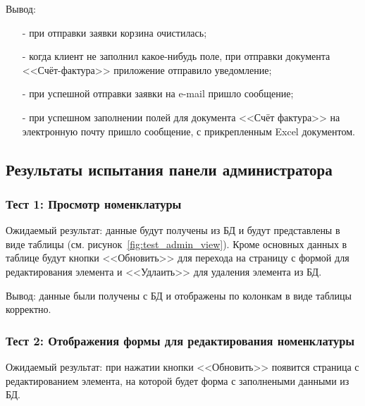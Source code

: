 Вывод:

\begin{itemize}
    \item[-] при отправки заявки корзина очистилась;
    \item[-] когда клиент не заполнил какое-нибудь поле, при отправки документа <<Счёт-фактура>>
    приложение отправило уведомление;
    \item[-] при успешной отправки заявки на e-mail пришло сообщение;
    \item[-] при успешном заполнении полей для документа <<Счёт фактура>> на электронную почту пришло сообщение,
    с прикрепленным Excel документом.
\end{itemize}

\subsection{Результаты испытания панели администратора}

\subsubsection*{Тест 1: Просмотр номенклатуры}

Ожидаемый результат: данные будут получены из БД и будут представлены в виде таблицы (см. рисунок~\ref{fig:test_admin_view}).
Кроме основных данных в таблице будут кнопки <<Обновить>> для перехода на страницу с формой для редактирования элемента и <<Удлаить>> для удаления элемента из БД.




Вывод: данные были получены с БД и отображены по колонкам в виде таблицы корректно.

\subsubsection*{Тест 2: Отображения формы для редактирования номенклатуры}

Ожидаемый результат: при нажатии кнопки <<Обновить>> появится страница с редактированием элемента,
на которой будет форма с заполнеными данными из БД.


